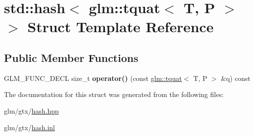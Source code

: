 \hypertarget{structstd_1_1hash_3_01glm_1_1tquat_3_01T_00_01P_01_4_01_4}{\section{std\-:\-:hash$<$ glm\-:\-:tquat$<$ T, P $>$ $>$ Struct Template Reference}
\label{structstd_1_1hash_3_01glm_1_1tquat_3_01T_00_01P_01_4_01_4}
}
\subsection*{Public Member Functions}
\begin{DoxyCompactItemize}
\item 
\hypertarget{structstd_1_1hash_3_01glm_1_1tquat_3_01T_00_01P_01_4_01_4_afa00211da6db5ac9fe06c49faca6cad5}{G\-L\-M\-\_\-\-F\-U\-N\-C\-\_\-\-D\-E\-C\-L size\-\_\-t {\bfseries operator()} (const \hyperlink{structglm_1_1tquat}{glm\-::tquat}$<$ T, P $>$ \&q) const }\label{structstd_1_1hash_3_01glm_1_1tquat_3_01T_00_01P_01_4_01_4_afa00211da6db5ac9fe06c49faca6cad5}

\end{DoxyCompactItemize}


The documentation for this struct was generated from the following files\-:\begin{DoxyCompactItemize}
\item 
glm/gtx/\hyperlink{hash_8hpp}{hash.\-hpp}\item 
glm/gtx/\hyperlink{hash_8inl}{hash.\-inl}\end{DoxyCompactItemize}
